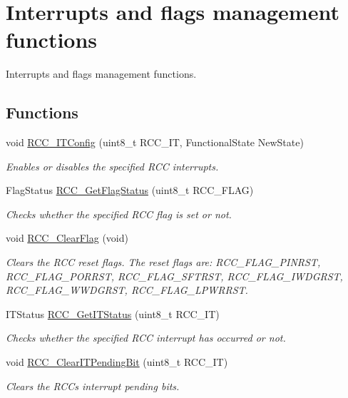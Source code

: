 \hypertarget{group___r_c_c___group4}{}\section{Interrupts and flags management functions}
\label{group___r_c_c___group4}


Interrupts and flags management functions.  


\subsection*{Functions}
\begin{DoxyCompactItemize}
\item 
void \mbox{\hyperlink{group___r_c_c___group4_gaa953aa226e9ce45300d535941e4dfe2f}{R\+C\+C\+\_\+\+I\+T\+Config}} (uint8\+\_\+t R\+C\+C\+\_\+\+IT, Functional\+State New\+State)
\begin{DoxyCompactList}\small\item\em Enables or disables the specified R\+CC interrupts. \end{DoxyCompactList}\item 
Flag\+Status \mbox{\hyperlink{group___r_c_c___group4_ga2897bdc52f272031c44fb1f72205d295}{R\+C\+C\+\_\+\+Get\+Flag\+Status}} (uint8\+\_\+t R\+C\+C\+\_\+\+F\+L\+AG)
\begin{DoxyCompactList}\small\item\em Checks whether the specified R\+CC flag is set or not. \end{DoxyCompactList}\item 
void \mbox{\hyperlink{group___r_c_c___group4_ga53f909dbb15a54124419084ebda97d72}{R\+C\+C\+\_\+\+Clear\+Flag}} (void)
\begin{DoxyCompactList}\small\item\em Clears the R\+CC reset flags. The reset flags are\+: R\+C\+C\+\_\+\+F\+L\+A\+G\+\_\+\+P\+I\+N\+R\+ST, R\+C\+C\+\_\+\+F\+L\+A\+G\+\_\+\+P\+O\+R\+R\+ST, R\+C\+C\+\_\+\+F\+L\+A\+G\+\_\+\+S\+F\+T\+R\+ST, R\+C\+C\+\_\+\+F\+L\+A\+G\+\_\+\+I\+W\+D\+G\+R\+ST, R\+C\+C\+\_\+\+F\+L\+A\+G\+\_\+\+W\+W\+D\+G\+R\+ST, R\+C\+C\+\_\+\+F\+L\+A\+G\+\_\+\+L\+P\+W\+R\+R\+ST. \end{DoxyCompactList}\item 
I\+T\+Status \mbox{\hyperlink{group___r_c_c___group4_ga6126c99f398ee4be410ad76ae3aee18f}{R\+C\+C\+\_\+\+Get\+I\+T\+Status}} (uint8\+\_\+t R\+C\+C\+\_\+\+IT)
\begin{DoxyCompactList}\small\item\em Checks whether the specified R\+CC interrupt has occurred or not. \end{DoxyCompactList}\item 
void \mbox{\hyperlink{group___r_c_c___group4_ga529842d165910f8f87e26115da36089b}{R\+C\+C\+\_\+\+Clear\+I\+T\+Pending\+Bit}} (uint8\+\_\+t R\+C\+C\+\_\+\+IT)
\begin{DoxyCompactList}\small\item\em Clears the R\+CC\textquotesingle{}s interrupt pending bits. \end{DoxyCompactList}\end{DoxyCompactItemize}


